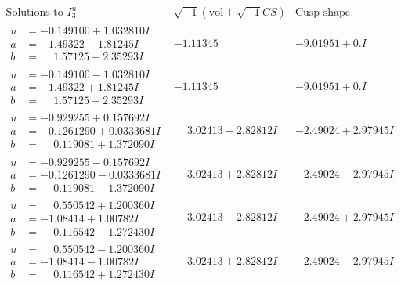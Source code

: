 \documentclass[1p]{elsarticle_modified}
\theoremstyle{definition}
\newcommand{\I}{\sqrt{-1}}
\begin{document}
$$\begin{array}{c|c|c}  
\text{Solutions to }I^u_{3}& \I (\text{vol} + \sqrt{-1}CS) & \text{Cusp shape}\\
 \hline 
\begin{aligned}
u &= -0.149100 + 1.032810 I \\
a &= -1.49322 - 1.81245 I \\
b &= \phantom{-}1.57125 + 2.35293 I\end{aligned}
 & -1.11345\phantom{ +0.000000I} & -9.01951 + 0. I\phantom{ +0.000000I} \\ \hline\begin{aligned}
u &= -0.149100 - 1.032810 I \\
a &= -1.49322 + 1.81245 I \\
b &= \phantom{-}1.57125 - 2.35293 I\end{aligned}
 & -1.11345\phantom{ +0.000000I} & -9.01951 + 0. I\phantom{ +0.000000I} \\ \hline\begin{aligned}
u &= -0.929255 + 0.157692 I \\
a &= -0.1261290 + 0.0333681 I \\
b &= \phantom{-}0.119081 + 1.372090 I\end{aligned}
 & \phantom{-}3.02413 - 2.82812 I & -2.49024 + 2.97945 I \\ \hline\begin{aligned}
u &= -0.929255 - 0.157692 I \\
a &= -0.1261290 - 0.0333681 I \\
b &= \phantom{-}0.119081 - 1.372090 I\end{aligned}
 & \phantom{-}3.02413 + 2.82812 I & -2.49024 - 2.97945 I \\ \hline\begin{aligned}
u &= \phantom{-}0.550542 + 1.200360 I \\
a &= -1.08414 + 1.00782 I \\
b &= \phantom{-}0.116542 - 1.272430 I\end{aligned}
 & \phantom{-}3.02413 - 2.82812 I & -2.49024 + 2.97945 I \\ \hline\begin{aligned}
u &= \phantom{-}0.550542 - 1.200360 I \\
a &= -1.08414 - 1.00782 I \\
b &= \phantom{-}0.116542 + 1.272430 I\end{aligned}
 & \phantom{-}3.02413 + 2.82812 I & -2.49024 - 2.97945 I \\ \hline\begin{aligned}

\end{aligned}
\end{array}$$
\end{document}
